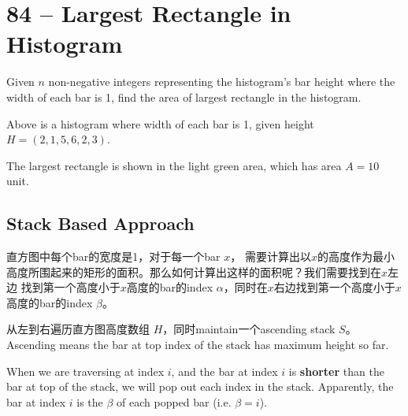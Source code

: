 \section{84 -- Largest Rectangle in Histogram}
Given $n$ non-negative integers representing the histogram's bar height where the width of each bar is 1, find the area of largest rectangle in the histogram.
\begin{figure}[H]
\end{figure}
Above is a histogram where width of each bar is 1, given height $H = (2,1,5,6,2,3)$.
\begin{figure}[H]
\end{figure}
The largest rectangle is shown in the light green area, which has area $A= 10$ unit.
\subsection{Stack Based Approach}
直方图中每个bar的宽度是1，对于每一个bar $x$， 需要计算出以$x$的高度作为最小高度所围起来的矩形的面积。那么如何计算出这样的面积呢？我们需要找到在$x$左边 找到第一个高度小于$x$高度的bar的index $\alpha$，同时在$x$右边找到第一个高度小于$x$高度的bar的index $\beta$。

从左到右遍历直方图高度数组 $H$，同时maintain一个ascending stack $S$。 Ascending means the bar at top index of the stack has maximum height so far.

When we are traversing at index $i$, and the bar at index $i$ is \textbf{shorter} than the bar at top of the stack, we will pop out each index in the stack. Apparently, the bar at index $i$ is the $\beta$ of each popped bar (i.e. $\beta=i$).

